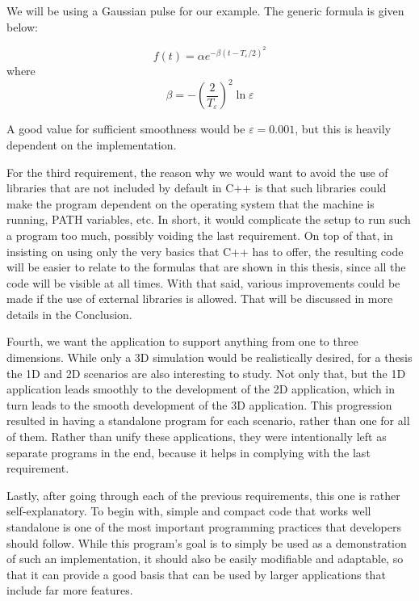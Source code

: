 We will be using a Gaussian pulse for our example. The generic formula is given below:

\begin{equation}
	\label{eqn:gaussianPulse}
	f(t) = \alpha e^{-\beta(t - T_\varepsilon/2)^2}
\end{equation}
where
\begin{equation}
	\label{eqn:gaussianBeta}
	\beta = - (\frac{2}{T_\varepsilon})^2 \ln\varepsilon
\end{equation}

A good value for sufficient smoothness would be $\varepsilon = 0.001$, but this is heavily dependent on the implementation.

For the third requirement, the reason why we would want to avoid the use of libraries that are not included by default in C++ is that such libraries could make the program dependent on the operating system that the machine is running, PATH variables, etc. In short, it would complicate the setup to run such a program too much, possibly voiding the last requirement. On top of that, in insisting on using only the very basics that C++ has to offer, the resulting code will be easier to relate to the formulas that are shown in this thesis, since all the code will be visible at all times. With that said, various improvements could be made if the use of external libraries is allowed. That will be discussed in more details in the Conclusion.

Fourth, we want the application to support anything from one to three dimensions. While only a 3D simulation would be realistically desired, for a thesis the 1D and 2D scenarios are also interesting to study. Not only that, but the 1D application leads smoothly to the development of the 2D application, which in turn leads to the smooth development of the 3D application. This progression resulted in having a standalone program for each scenario, rather than one for all of them. Rather than unify these applications, they were intentionally left as separate programs in the end, because it helps in complying with the last requirement.

Lastly, after going through each of the previous requirements, this one is rather self-explanatory. To begin with, simple and compact code that works well standalone is one of the most important programming practices that developers should follow. While this program's goal is to simply be used as a demonstration of such an implementation, it should also be easily modifiable and adaptable, so that it can provide a good basis that can be used by larger applications that include far more features.

